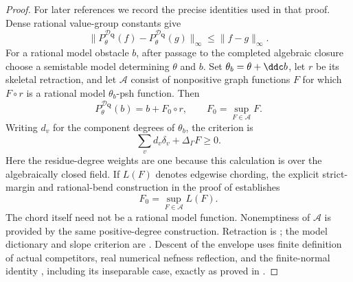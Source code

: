 \begin{proof}
For later references we record the precise identities used in that proof.
Dense rational value-group constants give
\begin{equation}\label{eq:curve-envelope-contraction}
 \bigl\|P^{\mathcal D_{\mathbf Q}}_\theta(f)
       -P^{\mathcal D_{\mathbf Q}}_\theta(g)\bigr\|_\infty
       \leq\|f-g\|_\infty.
\end{equation}
For a rational model obstacle $b$, after passage to the completed
algebraic closure choose a semistable model determining $\theta$ and $b$.
Set $\theta_b=\theta+\ddc b$, let $r$ be its skeletal retraction, and let
$\mathcal A$ consist of nonpositive graph functions $F$ for which
$F\circ r$ is a rational model $\theta_b$-psh function.  Then
\begin{equation}\label{eq:curve-envelope-retraction}
 P^{\mathcal D_{\mathbf Q}}_\theta(b)=b+F_0\circ r,
 \qquad F_0=\sup_{F\in\mathcal A}F.
\end{equation}
Writing $d_v$ for the component degrees of $\theta_b$, the criterion is
\begin{equation}\label{eq:curve-slope-criterion}
 \sum_{v}d_v\delta_v+\Delta_\Gamma F\geq0.
\end{equation}
Here the residue-degree weights are one because this calculation is over
the algebraically closed field.  If $L(F)$ denotes edgewise chording,
the explicit strict-margin and rational-bend construction in the proof of
 establishes
\begin{equation}\label{eq:curve-chord-supremum}
 F_0=\sup_{F\in\mathcal A}L(F).
\end{equation}
The chord itself need not be a rational model function.  Nonemptiness of
$\mathcal A$ is provided by the same positive-degree construction.
Retraction is \cite[Proposition~3.8]{GJKM19}; the model dictionary and
slope criterion are \cite[Propositions~3.5 and~3.7]{GJKM19}.
Descent of the envelope uses finite definition of actual competitors,
real numerical nefness reflection, and the finite-normal identity
\cite[Proposition~2.11]{GJKM19}, including its inseparable case, exactly
as proved in .


\end{proof}
